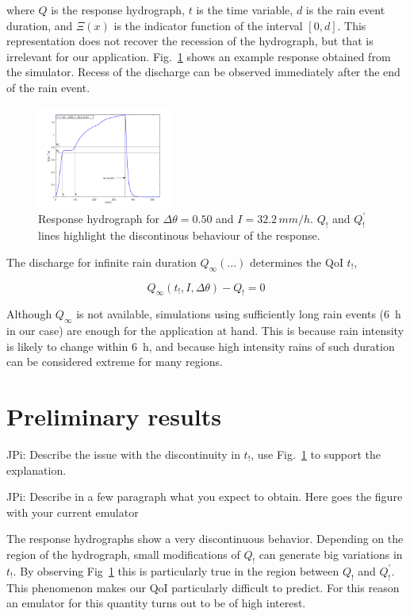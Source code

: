\documentclass[12pt,a4paper,english,twocolumn,fleqn]{narms}
\newcommand{\jpi}[1]{{\color{Magenta} JPi: #1}}
\begin{document}
\noindent where $Q$ is the response hydrograph, $t$ is the time variable, $d$ is the rain event duration, and $\Xi(x)$ is the indicator function of the interval $[0,d]$.
This representation does not recover the recession of the hydrograph, but that is irrelevant for our application.
Fig.~\ref{img:hydrograph} shows an example response obtained from the simulator.
Recess of the discharge can be observed immediately after the end of the rain event.

\begin{figure}[htpb]
  \centering
  \includegraphics[width=0.4\textwidth]{img/hydrograph.png}
  \caption{Response hydrograph for $\Delta\theta = 0.50$ and $I = 32.2\,mm/h$. $Q_!$ and $Q^\prime_!$ lines highlight the discontinous behaviour of the response.}
  \label{img:hydrograph}
\end{figure}

The discharge for infinite rain duration $Q_\infty(\ldots)$ determines the QoI $t_!$,

\begin{equation}
Q_\infty (t_!, I, \Delta\theta) - Q_! = 0
\end{equation}

\noindent Although $Q_\infty$ is not available, simulations using sufficiently long rain events (\SI{6}{\hour} in our case) are enough for the application at hand.
This is because rain intensity is likely to change within \SI{6}{\hour}, and because high intensity rains of such duration can be considered extreme for many regions.

\section{Preliminary results}

\jpi{Describe the issue with the discontinuity in $t_!$, use Fig.~\ref{img:hydrograph} to support the explanation.}

\jpi{Describe in a few paragraph what you expect to obtain. Here goes the figure with your current emulator}


The response hydrographs show a very discontinuous behavior. Depending on the region of the hydrograph, small modifications of $Q_!$ can generate big variations in $t_!$. By observing Fig~\ref{img:hydrograph} this is particularly true in the region between $Q_!$ and $Q^\prime_!$. This phenomenon makes our QoI particularly difficult to predict. For this reason an emulator for this quantity turns out to be of high interest.
\end{document}
